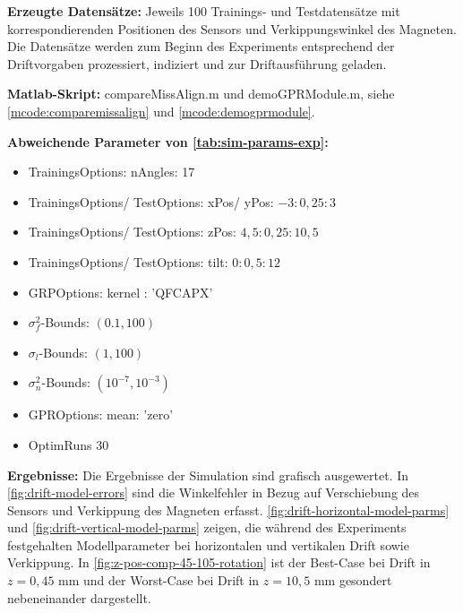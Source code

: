 \clearpage


\textbf{Erzeugte Datensätze:} Jeweils 100 Trainings- und Testdatensätze mit korrespondierenden Positionen des Sensors und Verkippungswinkel des Magneten. Die Datensätze werden zum Beginn des Experiments entsprechend der Driftvorgaben prozessiert, indiziert und zur Driftausführung geladen.

\textbf{Matlab-Skript:} compareMissAlign.m und demoGPRModule.m, siehe \autoref{mcode:comparemissalign} und \autoref{mcode:demogprmodule}.

\textbf{Abweichende Parameter von \autoref{tab:sim-params-exp}:}

\begin{itemize}
	\item TrainingsOptions: nAngles: 17
	\item TrainingsOptions/ TestOptions: xPos/ yPos: $-3:0,25:3$
	\item TrainingsOptions/ TestOptions: zPos: $4,5:0,25:10,5$
	\item TrainingsOptions/ TestOptions: tilt: $0:0,5:12$
	\item GRPOptions: kernel : 'QFCAPX'
	\item $\sigma_f^2$-Bounds: $(0.1,100)$
	\item $\sigma_l$-Bounds: $(1,100)$
	\item $\sigma_n^2$-Bounds: $(10^{-7},10^{-3})$
	\item GPROptions: mean: 'zero'
	\item OptimRuns 30
\end{itemize}

\textbf{Ergebnisse:} Die Ergebnisse der Simulation sind grafisch ausgewertet. In \autoref{fig:drift-model-errors} sind die Winkelfehler in Bezug auf Verschiebung des Sensors und Verkippung des Magneten erfasst.
\autoref{fig:drift-horizontal-model-parms} und \autoref{fig:drift-vertical-model-parms} zeigen, die während des Experiments festgehalten Modellparameter bei horizontalen und vertikalen Drift sowie Verkippung. In \autoref{fig:z-pos-comp-45-105-rotation} ist der Best-Case bei Drift in $z = 0,45$ mm und der Worst-Case bei Drift in $z = 10,5$ mm gesondert nebeneinander dargestellt.


\clearpage


